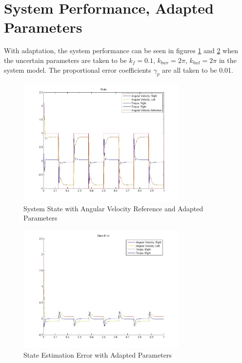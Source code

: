 \documentclass[letterpaper,12pt]{report}
\begin{document}
\section{System Performance, Adapted \mbox{Parameters}}
With adaptation, the system performance can be seen in figures \ref{fig:ssApDiagram1} and \ref{fig:seApDiagram1} when the uncertain parameters are taken to be $k_f = 0.1$, $k_{bwr} = 2\pi$, $k_{bwl} = 2\pi$ in the system model.
The proportional error coefficients $\gamma_p$ are all taken to be 0.01.
\begin{figure}[H!]
	\centering
	\includegraphics[width=0.75\textwidth]{Adapted_State1.jpg}
	\caption{System State with Angular Velocity Reference and Adapted Parameters}
	\label{fig:ssApDiagram1}
\end{figure}
\begin{figure}[H!]
	\centering
	\includegraphics[width=0.75\textwidth]{Adapted_StateError1.jpg}
	\caption{State Estimation Error with Adapted Parameters}
	\label{fig:seApDiagram1}
\end{figure}
\end{document}
